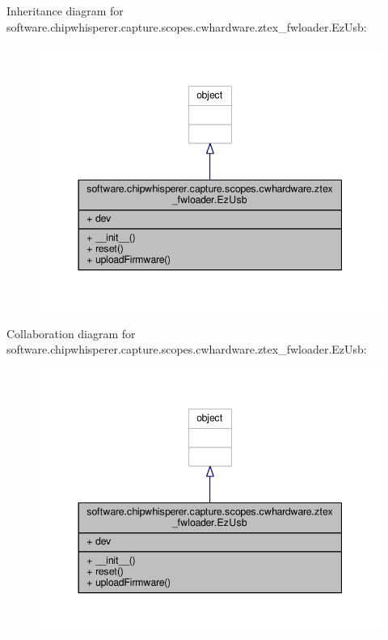 Inheritance diagram for software.\+chipwhisperer.\+capture.\+scopes.\+cwhardware.\+ztex\+\_\+fwloader.\+Ez\+Usb\+:\nopagebreak
\begin{figure}[H]
\begin{center}
\leavevmode
\includegraphics[width=344pt]{df/d83/classsoftware_1_1chipwhisperer_1_1capture_1_1scopes_1_1cwhardware_1_1ztex__fwloader_1_1EzUsb__inherit__graph}
\end{center}
\end{figure}


Collaboration diagram for software.\+chipwhisperer.\+capture.\+scopes.\+cwhardware.\+ztex\+\_\+fwloader.\+Ez\+Usb\+:\nopagebreak
\begin{figure}[H]
\begin{center}
\leavevmode
\includegraphics[width=344pt]{d3/d38/classsoftware_1_1chipwhisperer_1_1capture_1_1scopes_1_1cwhardware_1_1ztex__fwloader_1_1EzUsb__coll__graph}
\end{center}
\end{figure}


